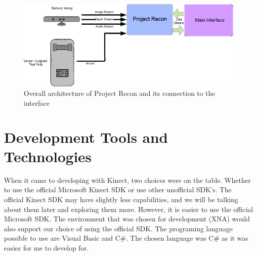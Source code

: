 \begin{figure}[ht]
\centering
\includegraphics[width=1\textwidth]{images/general_overview.png}
\caption{Overall architecture of Project Recon and its connection to the interface}
\label{generaloverview}
\end{figure}
\section{Development Tools and Technologies}
When it came to developing with Kinect, two choices were on the table. Whether to use the official Microsoft Kinect SDK or use other unofficial SDK's. The official Kinect SDK may have slightly less capabilities, and we will be talking about them later and exploring them more. However, it is easier to use the official Microsoft SDK. The environment that was chosen for development (XNA) would also support our choice of using the official SDK. The programing language possible to use are Visual Basic and C\#. The chosen language was C\# as it was easier for me to develop for.

